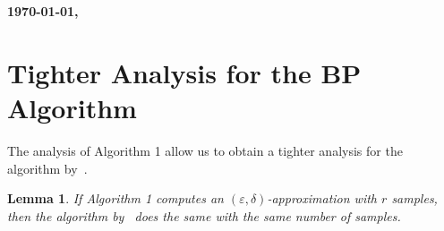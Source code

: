\documentclass{article}
\title{}
\author{}
\newtheorem{lemma}{Lemma}
\begin{document}
{\bf \large \today, \currenttime}

\section{Tighter Analysis for the BP Algorithm}
The analysis of Algorithm 1 allow us to obtain a tighter analysis for the
algorithm by~\citet{BrandesP07}.

\begin{lemma}
  If Algorithm 1 computes an $(\varepsilon,\delta)$-approximation with $r$
  samples, then the algorithm by~\citep{BrandesP07} does the same with the same
  number of samples.
\end{lemma}
\end{document}
